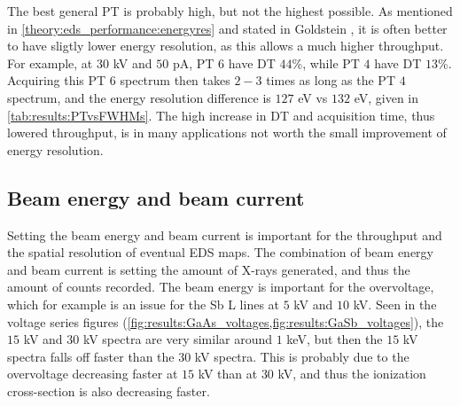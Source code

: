 The best general PT is probably high, but not the highest possible.
As mentioned in \cref{theory:eds_performance:energyres} and stated in Goldstein \cite{goldstein_scanning_2018}, it is often better to have sligtly lower energy resolution, as this allows a much higher throughput.
For example, at $30$ kV and $50$ pA, PT $6$ have DT $44$\%, while PT $4$ have DT $13$\%.
Acquiring this PT $6$ spectrum then takes $2-3$ times as long as the PT $4$ spectrum, and the energy resolution difference is $127$ eV vs $132$ eV, given in \cref{tab:results:PTvsFWHMs}.
The high increase in DT and acquisition time, thus lowered throughput, is in many applications not worth the small improvement of energy resolution.



\subsection{Beam energy and beam current}
\label{discussion:beam_energy_current}

Setting the beam energy and beam current is important for the throughput and the spatial resolution of eventual EDS maps.
The combination of beam energy and beam current is setting the amount of X-rays generated, and thus the amount of counts recorded.
The beam energy is important for the overvoltage, which for example is an issue for the Sb L lines at $5$ kV and $10$ kV.
Seen in the voltage series figures (\cref{fig:results:GaAs_voltages,fig:results:GaSb_voltages}), the $15$ kV and $30$ kV spectra are very similar around $1$ keV, but then the $15$ kV spectra falls off faster than the $30$ kV spectra.
This is probably due to the overvoltage decreasing faster at $15$ kV than at $30$ kV, and thus the ionization cross-section is also decreasing faster.

